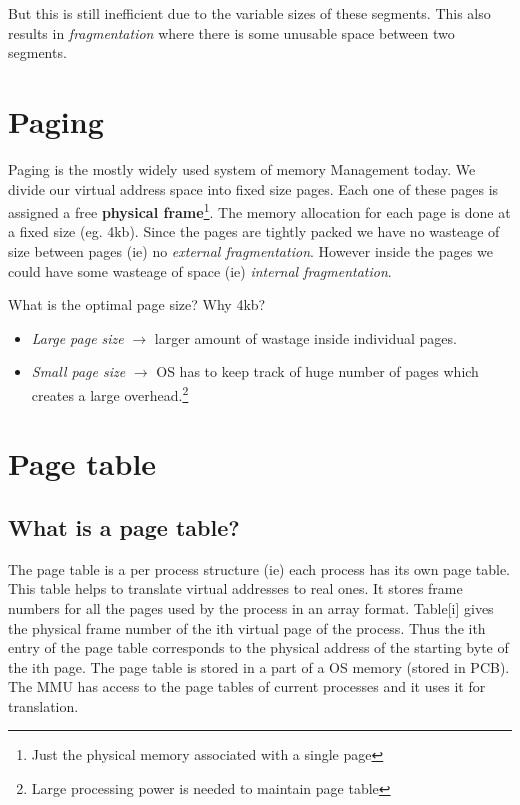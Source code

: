 \documentclass[12pt]{article}
\newcommand{\tbox}[1]{\noindent\fbox{\parbox{\textwidth}{#1}}}
\begin{document}
But this is still inefficient due to the variable sizes of these segments. This also results in \textit{fragmentation} where there is some unusable space between two segments. 

\section{Paging}
Paging is the mostly widely used system of memory Management today. We divide our virtual address space into fixed size pages. Each one of these pages is assigned a free \textbf{physical frame}\footnote{Just the physical memory associated with a single page}.
The memory allocation for each page is done at a fixed size (eg. 4kb). Since the pages are tightly packed we have no wasteage of size between pages (ie) no \textit{external fragmentation}. However inside the pages we could have some wasteage of space (ie) \textit{internal fragmentation}.

What is the optimal page size? Why 4kb?
\begin{itemize}[topsep=-5mm, partopsep=0pt, itemsep=0pt, parsep=0pt]
    \item \textit{Large page size} \(\rightarrow\) larger amount of wastage inside individual pages.
    \item \textit{Small page size} \(\rightarrow\) OS has to keep track of huge number of pages which creates a large overhead.\footnote{Large processing power is needed to maintain page table}
\end{itemize}
\newpage

\noindent\tbox{
    \begin{center}
    \textbf{\Huge Lecture 13}
    \end{center}
}
\section{Page table}
\subsection*{What is a page table?}
The page table is a per process structure (ie) each process has its own page table. This table helps to translate
virtual addresses to real ones. It stores frame numbers for all the pages used by the process in an array format. 
Table[i] gives the physical frame number of the ith virtual page of the process. Thus the ith entry of the page table corresponds to the physical address of the starting byte of the ith page. The page table is stored in a part of a OS memory (stored in PCB). The MMU has 
access to the page tables of current processes and it uses it for translation. 
\end{document}
